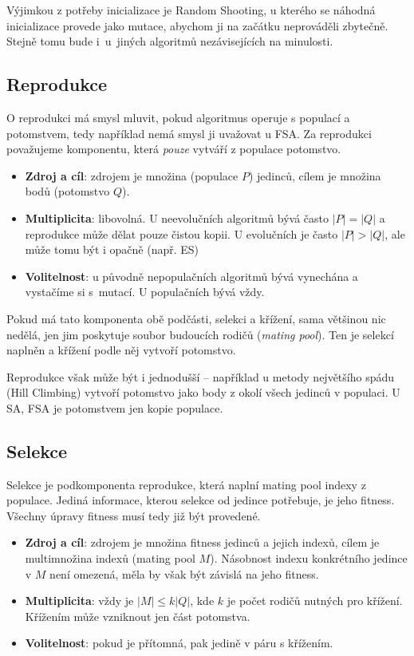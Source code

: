 Výjimkou z potřeby inicializace je Random Shooting, u kterého se náhodná inicializace provede jako mutace, abychom ji na začátku neprováděli zbytečně. Stejně tomu bude i~u~jiných algoritmů nezávisejících na minulosti.

\subsection{Reprodukce}

O reprodukci má smysl mluvit, pokud algoritmus operuje s populací a potomstvem, tedy například nemá smysl ji uvažovat u FSA. Za reprodukci považujeme komponentu, která \emph{pouze} vytváří z populace potomstvo.
\begin{itemize}
  \item \textbf{Zdroj a cíl}: zdrojem je množina (populace $P$) jedinců, cílem je množina bodů (potomstvo $Q$).
  \item \textbf{Multiplicita}: libovolná. U neevolučních algoritmů bývá často $|P|=|Q|$ a reprodukce může dělat pouze čistou kopii. U evolučních je často $|P|>|Q|$, ale může tomu být i opačně (např. ES)
  \item \textbf{Volitelnost}: u původně nepopulačních algoritmů bývá vynechána a vystačíme si s~mutací. U populačních bývá vždy.
\end{itemize}

Pokud má tato komponenta obě podčásti, selekci a křížení, sama většinou nic nedělá, jen jim poskytuje soubor budoucích rodičů (\emph{mating pool}). Ten je selekcí naplněn a křížení podle něj vytvoří potomstvo.

Reprodukce však může být i jednodušší -- například u metody největšího spádu (Hill Climbing) vytvoří potomstvo jako body z okolí všech jedinců v populaci. U SA, FSA je potomstvem jen kopie populace.

\subsection{Selekce}

Selekce je podkomponenta reprodukce, která naplní mating pool indexy z populace. Jediná informace, kterou selekce od jedince potřebuje, je jeho fitness. Všechny úpravy fitness musí tedy již být provedené.

\begin{itemize}
  \item \textbf{Zdroj a cíl}: zdrojem je množina fitness jedinců a jejich indexů, cílem je multimnožina indexů (mating pool $M$). Násobnost indexu konkrétního jedince v $M$ není omezená, měla by však být závislá na jeho fitness.
  \item \textbf{Multiplicita}: vždy je $|M| \leq k|Q|$, kde $k$ je počet rodičů nutných pro křížení. Křížením může vzniknout jen část potomstva.
  \item \textbf{Volitelnost}: pokud je přítomná, pak jedině v páru s křížením.
\end{itemize}

